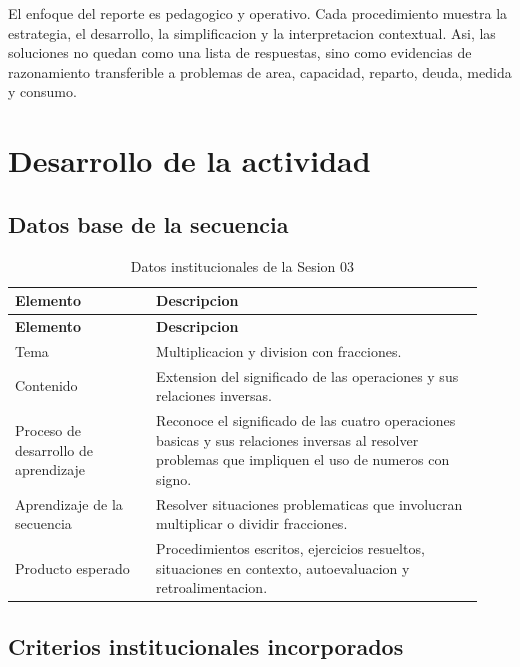 \documentclass[
	spanish,
	letterpaper, oneside
]{article}
\begin{document}
El enfoque del reporte es pedagogico y operativo. Cada procedimiento muestra la estrategia, el desarrollo, la simplificacion y la interpretacion contextual. Asi, las soluciones no quedan como una lista de respuestas, sino como evidencias de razonamiento transferible a problemas de area, capacidad, reparto, deuda, medida y consumo.

\section{Desarrollo de la actividad}

\subsection{Datos base de la secuencia}

\begin{longtable}{@{}p{0.28\linewidth}p{0.65\linewidth}@{}}
	\caption{Datos institucionales de la Sesion 03}\label{tab:datos-sesion03}\\
	\toprule
	\textbf{Elemento} & \textbf{Descripcion} \\
	\midrule
	\endfirsthead
	\toprule
	\textbf{Elemento} & \textbf{Descripcion} \\
	\midrule
	\endhead
	Tema & Multiplicacion y division con fracciones. \\
	Contenido & Extension del significado de las operaciones y sus relaciones inversas. \\
	Proceso de desarrollo de aprendizaje & Reconoce el significado de las cuatro operaciones basicas y sus relaciones inversas al resolver problemas que impliquen el uso de numeros con signo. \\
	Aprendizaje de la secuencia & Resolver situaciones problematicas que involucran multiplicar o dividir fracciones. \\
	Producto esperado & Procedimientos escritos, ejercicios resueltos, situaciones en contexto, autoevaluacion y retroalimentacion. \\
	\bottomrule
\end{longtable}

\subsection{Criterios institucionales incorporados}
\end{document}
